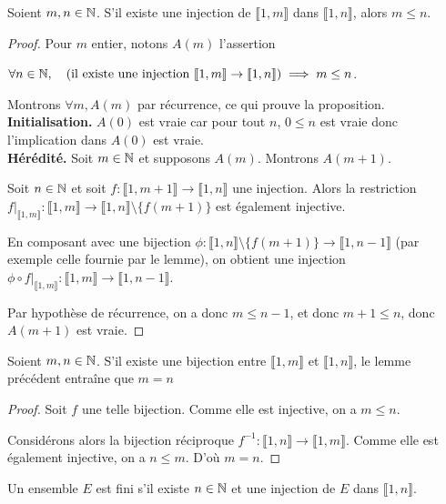 \begin{lemme}
Soient $m,n\in \mathbb{N}$.
S'il existe une injection de $\llbracket 1,m\rrbracket$ dans $\llbracket 1,n\rrbracket$, alors $m\leq n$.
\end{lemme}
\begin{proof}
Pour $m$ entier, notons $A(m)$ l'assertion 
\begin{center}
$\forall n\in \mathbb{N}, \quad  (\text{il existe une injection } \llbracket 1,m\rrbracket \to \llbracket 1,n\rrbracket) \implies m\leq n$.
\end{center}
Montrons $\forall m, A(m)$ par récurrence, ce qui prouve la proposition.\\
\textbf{Initialisation.} $A(0)$ est vraie car pour tout $n$, $0\leq n$ est vraie donc l'implication dans $A(0)$ est vraie.\\
\textbf{Hérédité.} Soit $m\in\mathbb{N}$ et supposons $A(m)$. Montrons $A(m+1)$.

Soit $n\in \mathbb{N}$ et soit $f : \llbracket 1,m+1\rrbracket \to \llbracket 1,n\rrbracket$ une injection. Alors la restriction $f|_{\llbracket 1,m\rrbracket} : \llbracket 1,m\rrbracket \to \llbracket 1,n\rrbracket\setminus \{f(m+1)\}$ est également injective.

En composant avec une bijection $\phi : \llbracket 1,n\rrbracket\setminus \{f(m+1)\} \to \llbracket 1,n-1\rrbracket$ (par exemple celle fournie par le lemme), on obtient une injection $\phi\circ f|_{\llbracket 1,m\rrbracket} : \llbracket 1,m\rrbracket \to \llbracket 1,n-1\rrbracket$.

Par hypothèse de récurrence, on a donc $m\leq n-1$, et donc $m+1\leq n$, donc $A(m+1)$ est vraie.
\end{proof}

\begin{lemme}
Soient $m, n\in \mathbb{N}$. S'il existe une bijection entre $\llbracket 1,m\rrbracket$ et $\llbracket 1,n\rrbracket$, le lemme précédent entraîne que $m=n$
\end{lemme}
\begin{proof}
Soit $f$ une telle bijection. Comme elle est injective, on a $m\leq n$.

Considérons alors la bijection réciproque $f^{-1} : \llbracket 1,n\rrbracket \to \llbracket 1,m\rrbracket$. Comme elle est également  injective, on a $n\leq m$. D'où $m=n$.
\end{proof}


\begin{definition}
Un ensemble $E$ est fini s'il existe $n\in \mathbb{N}$ et une injection de $E$ dans $\llbracket 1,n\rrbracket$.
\end{definition}

